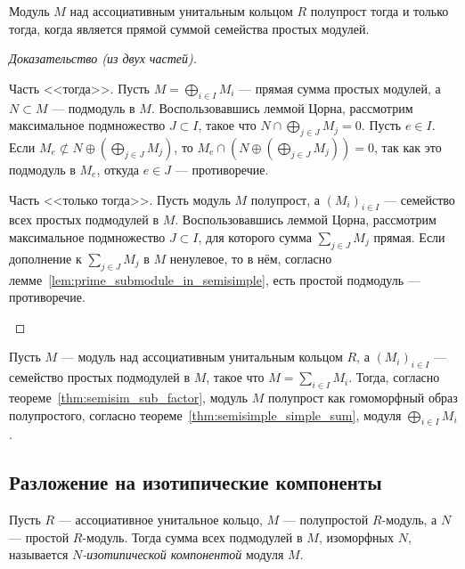 \documentclass[
	extrafontsizes,
	11pt,
	hyphens,
]{memoir}
\begin{document}
\begin{theorem}\label{thm:semisimple_simple_sum}
Модуль \(M\)  над ассоциативным унитальным кольцом \(R\) полупрост тогда и только тогда, когда является прямой суммой семейства простых модулей.
\end{theorem}

\begin{proof}[Доказательство (из двух частей)]
~\begin{proofdescription}

\item[Часть <<тогда>>.]
Пусть \(M = \bigoplus_{i \in I} M_i\) --- прямая сумма простых модулей, а \(N \subset M\) --- подмодуль в \(M\). Воспользовавшись леммой Цорна, рассмотрим максимальное подмножество \(J \subset I\), такое что \(N \cap \bigoplus_{j \in J} M_j = 0\). 
Пусть \(e \in I\).
Если \(M_e \not\subset N \oplus (\bigoplus_{j \in J} M_j)\), то \(M_e \cap (N \oplus (\bigoplus_{j \in J} M_j)) = 0\), так как это подмодуль в \(M_e\), откуда \(e \in J\) --- противоречие.

\item[Часть <<только тогда>>.]
Пусть модуль \(M\) полупрост, а \((M_i)_{i \in I}\) --- семейство всех простых подмодулей в \(M\). Воспользовавшись леммой Цорна, рассмотрим максимальное подмножество \(J \subset I\), для которого сумма \(\sum_{j \in J} M_j\) прямая. Если дополнение к \(\sum_{j \in J} M_j\) в \(M\) ненулевое, то в нём, согласно лемме~\ref{lem:prime_submodule_in_semisimple}, есть простой подмодуль --- противоречие.
\qedhere

\end{proofdescription}
\end{proof}

\begin{observation}
Пусть \(M\) --- модуль над ассоциативным унитальным кольцом \(R\), а \((M_i)_{i \in I}\) --- семейство простых подмодулей в \(M\), такое что \(M = \sum_{i \in I} M_i\). Тогда, согласно теореме~\ref{thm:semisim_sub_factor}, модуль \(M\) полупрост как гомоморфный образ полупростого, согласно теореме~\ref{thm:semisimple_simple_sum}, модуля \(\bigoplus_{i \in I} M_i\).
\end{observation}

\subsection{Разложение на изотипические компоненты}

\begin{definition}
Пусть \(R\) --- ассоциативное унитальное кольцо, \(M\) --- полупростой \(R\)-модуль, а \(N\) --- простой \(R\)-модуль. Тогда сумма всех подмодулей в \(M\), изоморфных \(N\), называется \emph{\(N\)-изо\-ти\-пи\-чес\-кой компонентой} модуля \(M\).
\end{definition}
\end{document}
